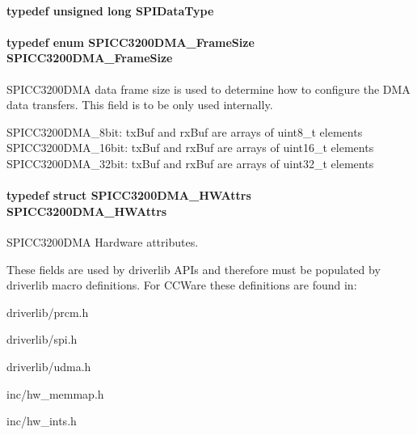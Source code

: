 \paragraph[{S\+P\+I\+Data\+Type}]{\setlength{\rightskip}{0pt plus 5cm}typedef unsigned long {\bf S\+P\+I\+Data\+Type}}\label{_s_p_i_c_c3200_d_m_a_8h_ac69c2f2d8cda29733c058bf8e0233af7}
\paragraph[{S\+P\+I\+C\+C3200\+D\+M\+A\+\_\+\+Frame\+Size}]{\setlength{\rightskip}{0pt plus 5cm}typedef enum {\bf S\+P\+I\+C\+C3200\+D\+M\+A\+\_\+\+Frame\+Size}  {\bf S\+P\+I\+C\+C3200\+D\+M\+A\+\_\+\+Frame\+Size}}\label{_s_p_i_c_c3200_d_m_a_8h_ad45a7b86b506d187ac96bc24d0475cd6}


S\+P\+I\+C\+C3200\+D\+M\+A data frame size is used to determine how to configure the D\+M\+A data transfers. This field is to be only used internally. 

S\+P\+I\+C\+C3200\+D\+M\+A\+\_\+8bit\+: tx\+Buf and rx\+Buf are arrays of uint8\+\_\+t elements S\+P\+I\+C\+C3200\+D\+M\+A\+\_\+16bit\+: tx\+Buf and rx\+Buf are arrays of uint16\+\_\+t elements S\+P\+I\+C\+C3200\+D\+M\+A\+\_\+32bit\+: tx\+Buf and rx\+Buf are arrays of uint32\+\_\+t elements 
\paragraph[{S\+P\+I\+C\+C3200\+D\+M\+A\+\_\+\+H\+W\+Attrs}]{\setlength{\rightskip}{0pt plus 5cm}typedef struct {\bf S\+P\+I\+C\+C3200\+D\+M\+A\+\_\+\+H\+W\+Attrs}  {\bf S\+P\+I\+C\+C3200\+D\+M\+A\+\_\+\+H\+W\+Attrs}}\label{_s_p_i_c_c3200_d_m_a_8h_a62f07fdc6837972d70b05231fc3b3501}


S\+P\+I\+C\+C3200\+D\+M\+A Hardware attributes. 

These fields are used by driverlib A\+P\+Is and therefore must be populated by driverlib macro definitions. For C\+C\+Ware these definitions are found in\+:
\begin{DoxyItemize}
\item driverlib/prcm.\+h
\item driverlib/spi.\+h
\item driverlib/udma.\+h
\item inc/hw\+\_\+memmap.\+h
\item inc/hw\+\_\+ints.\+h
\end{DoxyItemize}

